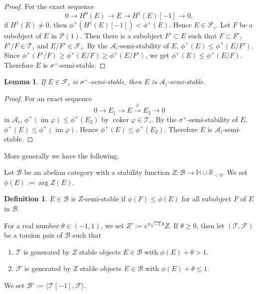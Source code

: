 \documentclass[leqno,11pt]{amsart}
\def\H{\ensuremath{\mathbb{H}}}
\def\R{\ensuremath{\mathbb{R}}}
\def\im{\mathop{\mathrm{im}}\nolimits}
\def\coker{\mathop{\mathrm{coker}}\nolimits}
\newtheorem{Lem}[Thm]{Lemma}
\theoremstyle{definition}
\newtheorem{Def}[Thm]{Definition}
\def\H{\ensuremath{\mathbb{H}}}
\def\R{\ensuremath{\mathbb{R}}}
\def\AA{\ensuremath{\mathcal A}}
\def\BB{\ensuremath{\mathcal B}}
\def\FF{\ensuremath{\mathcal F}}
\def\PP{\ensuremath{\mathcal P}}
\def\TT{\ensuremath{\mathcal T}}
\begin{document}
\begin{proof}
For the exact sequence
\begin{equation}
0 \to H^0(E) \to E \to H^1(E)[-1] \to 0,
\end{equation}
if $H^1(E) \ne 0$, then $\phi^+(H^1(E)[-1])<\phi^+(E)$.
Hence $E \in \FF_i$.
Let $F$ be a subobject of $E$ in $\PP(1)$.
Then there is a subobject $F' \subset E$ such that
$F \subset F'$, $F'/F \in \TT_i$ and $E/F' \in \FF_i$.
By the $\AA_i$-semi-stability of $E$, 
$\phi^+(E) \leq \phi^+(E/F')$.
Since $\phi^+(F'/F) \geq \phi^+(E/F) \geq \phi^+(E/F')$,
we get $\phi^+(E) \leq \phi^+(E/F)$.
Therefore $E$ is $\sigma^+$-semi-stable.
\end{proof}



\begin{Lem}
If $E \in \FF_i$ is $\sigma^+$-semi-stable, then
$E$ is $\AA_i$-semi-stable.
\end{Lem}

\begin{proof}
For an exact sequence
\begin{equation}
0 \to E_1 \to E \overset{\varphi}{\to} E_2 \to 0
\end{equation}
in $\AA_i$,
$\phi^+(\im \varphi) \leq \phi^+(E_2)$ by
$\coker \varphi \in \TT_i$.
By the $\sigma^+$-semi-stability of $E$,
$\phi^+(E) \leq \phi^+(\im \varphi)$.
Hence $\phi^+(E) \leq \phi^+(E_2)$.
Therefore $E$ is $\AA_i$-semi-stable.
\end{proof} 

More generally we have the following.

Let $\BB$ be an abelian category with a  
stability function $Z:\BB \to \H \cup \R_{<0}$. 
We set $\phi(E):=\arg Z(E)$.
\begin{Def}
$E \in \BB$ is $Z$-semi-stable if
$\phi(F) \leq \phi(E)$ for all subobject $F$ of $E$
in $\BB$.
\end{Def}

For a real number $\theta \in (-1,1)$, 
we set $Z':=e^{\pi \sqrt{-1} \theta} Z$.
If $\theta \geq 0$, then
let $(\TT,\FF)$ be a torsion pair of $\BB$
such that
\begin{enumerate}
\item
$\TT$ is generated by $Z$ stable objects $E \in \BB$ with
$\phi(E)+\theta>1$. 
\item
$\FF$ is generated by $Z$ stable objects $E \in \BB$ with
$\phi(E)+\theta \leq 1$. 
\end{enumerate}
We set $\BB':=\langle \TT[-1],\FF \rangle$.
\end{document}
